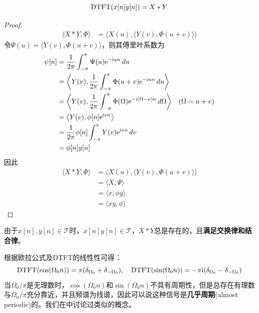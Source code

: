 \begin{theorem}[频域卷积定理]
    $$\operatorname{DTFT}(x[n]y[n])=X*Y$$
\end{theorem}
\begin{proof}
    \begin{align*}
        \langle X*Y,\Phi\rangle & =\langle X(u),\langle Y(v),\Phi(u+v)\rangle\rangle
    \end{align*}
    令$\Psi(u)=\langle Y(v),\Phi(u+v)\rangle$，则其傅里叶系数为
    \begin{align*}
        \psi[n] & =\frac{1}{2\pi}\int_{-\pi}^\pi \Psi(u)\mathrm{e}^{-\mathrm{i} un}\,du                                                                  \\
                & =\left\langle Y(v),\frac{1}{2\pi}\int_{-\pi}^\pi \Phi(u+v)\mathrm{e}^{-\mathrm{i} un}\,du\right\rangle                                 \\
                & =\left\langle Y(v),\frac{1}{2\pi}\int_{-\pi}^\pi \Phi(\Omega)\mathrm{e}^{-\mathrm{i} (\Omega-v)n}\,d\Omega\right\rangle & (\Omega=u+v) \\
                & =\left\langle Y(v),\phi[n]\mathrm{e}^{\mathrm{i} vn}\right\rangle                                                                      \\
                & =\frac{1}{2\pi}\phi[n]\int_{-\pi}^\pi Y(v)\mathrm{e}^{\mathrm{i} vn}\,dv                                                               \\
                & =\phi[n]y[n]
    \end{align*}
    因此
    \begin{align*}
        \langle X*Y,\Phi\rangle & =\langle X(u),\langle Y(v),\Phi(u+v)\rangle\rangle \\
                                & =\langle X,\Psi\rangle                             \\
                                & =\langle x,\phi y\rangle                           \\
                                & =\langle xy,\phi\rangle
    \end{align*}
\end{proof}

由于$x[n],y[n]\in\mathcal{T}$时，$x[n]y[n]\in\mathcal{T}$，$X*Y$总是存在的，且\textbf{满足交换律和结合律}。

\begin{example}\label{exmp:cos_DTFT}
    根据欧拉公式及DTFT的线性性可得：
    $$\operatorname{DTFT}(\cos(\Omega_0 n))=\pi(\delta_{\Omega_0}+\delta_{-\Omega_0}),\quad \operatorname{DTFT}(\sin(\Omega_0 n))=-\pi\mathrm{i}(\delta_{\Omega_0}-\delta_{-\Omega_0})$$
    当$\Omega_0/\pi$是无理数时，$\cos(\Omega_0 n)$和$\sin(\Omega_0 n)$不具有周期性，但是总存在有理数与$\Omega_0/\pi$充分靠近，并且频谱为线谱，因此可以说这种信号是\textbf{几乎周期}(almost periodic)的。我们在中讨论过类似的概念。
\end{example}

